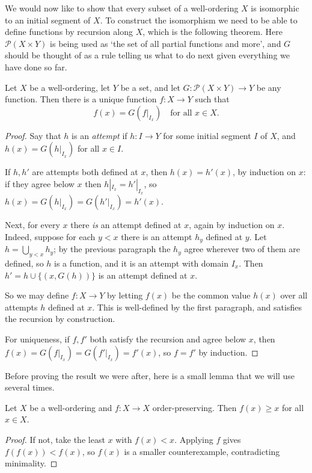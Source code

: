 We would now like to show that every subset of a well-ordering $X$ is isomorphic to an initial segment of $X$. To construct the isomorphism we need to be able to define functions by recursion along $X$, which is the following theorem. Here $\mathcal{P}(X \times Y)$ is being used as `the set of all partial functions and more', and $G$ should be thought of as a rule telling us what to do next given everything we have done so far.

\begin{theorem}\label{thm:worecursion}
Let $X$ be a well-ordering, let $Y$ be a set, and let $G: \mathcal{P}(X \times Y) \rightarrow Y$ be any function. Then there is a unique function $f: X \rightarrow Y$ such that
$$f(x) = G\left(\left.f\right|_{I_x}\right) \quad \text{for all } x \in X.$$
\end{theorem}
\begin{proof}
Say that $h$ is an \emph{attempt} if $h : I \rightarrow Y$ for some initial segment $I$ of $X$, and $h(x) = G(h|_{I_x})$ for all $x \in I$.

If $h, h'$ are attempts both defined at $x$, then $h(x) = h'(x)$, by induction on $x$: if they agree below $x$ then $h|_{I_x} = h'|_{I_x}$, so $h(x) = G(h|_{I_x}) = G(h'|_{I_x}) = h'(x)$.

Next, for every $x$ there \emph{is} an attempt defined at $x$, again by induction on $x$. Indeed, suppose for each $y < x$ there is an attempt $h_y$ defined at $y$. Let $h = \bigcup_{y<x} h_y$; by the previous paragraph the $h_y$ agree wherever two of them are defined, so $h$ is a function, and it is an attempt with domain $I_x$. Then $h' = h \cup \{(x, G(h))\}$ is an attempt defined at $x$.

So we may define $f: X \to Y$ by letting $f(x)$ be the common value $h(x)$ over all attempts $h$ defined at $x$. This is well-defined by the first paragraph, and satisfies the recursion by construction.

For uniqueness, if $f, f'$ both satisfy the recursion and agree below $x$, then $f(x) = G(f|_{I_x}) = G(f'|_{I_x}) = f'(x)$, so $f = f'$ by induction.
\end{proof}

Before proving the result we were after, here is a small lemma that we will use several times.

\begin{lemma}\label{lem:orderpreservingup}
  Let $X$ be a well-ordering and $f: X \to X$ order-preserving. Then $f(x) \geq x$ for all $x \in X$.
\end{lemma}
\begin{proof}
  If not, take the least $x$ with $f(x) < x$. Applying $f$ gives $f(f(x)) < f(x)$, so $f(x)$ is a smaller counterexample, contradicting minimality.
\end{proof}

